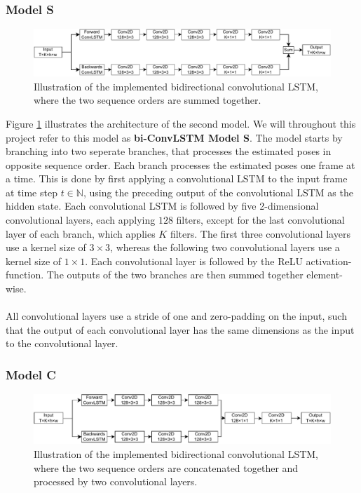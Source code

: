 \documentclass[./main.tex]{subfiles}
\begin{document}
\subsubsection{Model S}
\begin{figure}[htbp]
    \centering
    \includegraphics[width=\textwidth]{./entities/bi_conv_lstm.pdf}
    \caption{Illustration of the implemented bidirectional convolutional LSTM, where the two sequence orders are summed together.}
    \label{fig:bi_conv_lstm}
\end{figure}
\noindent Figure \ref{fig:bi_conv_lstm} illustrates the architecture of the second model. We will throughout this project refer to this model as \textbf{bi-ConvLSTM Model S}. The model starts by branching into two seperate branches, that processes the estimated poses in opposite sequence order. Each branch processes the estimated poses one frame at a time. This is done by first applying a convolutional LSTM to the input frame at time step $t \in \mathbb{N}$, using the preceding output of the convolutional LSTM as the hidden state. Each convolutional LSTM is followed by five 2-dimensional convolutional layers, each applying $128$ filters, except for the last convolutional layer of each branch, which applies $K$ filters. The first three convolutional layers use a kernel size of $3 \times 3$, whereas the following two convolutional layers use a kernel size of $1 \times 1$. Each convolutional layer is followed by the ReLU activation-function. The outputs of the two branches are then summed together element-wise.
\\
\\
All convolutional layers use a stride of one and zero-padding on the input, such that the output of each convolutional layer has the same dimensions as the input to the convolutional layer.

\subsubsection{Model C}
\begin{figure}[htbp]
    \centering
    \includegraphics[width=\textwidth]{./entities/unipose2.pdf}
    \caption{Illustration of the implemented bidirectional convolutional LSTM, where the two sequence orders are concatenated together and processed by two convolutional layers.}
    \label{fig:unipose2}
\end{figure}
\end{document}
